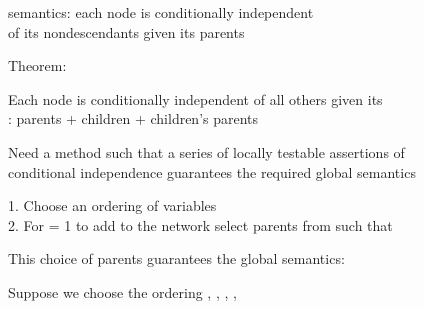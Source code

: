 \documentclass{article}
\begin{document}
\begin{huge}

 semantics: each node is conditionally independent\\
of its nondescendants given its parents

\vspace*{0.2in}

\textwidth
{}

Theorem:  \mat{$\lequiv$} 




Each node is conditionally independent of all others given its\\
: parents + children + children's parents

\vspace*{0.3in}

\textwidth
{}




Need a method such that a series of locally testable assertions of\\
conditional independence guarantees the required global semantics

1. Choose an ordering of variables \\
2. For  = 1 to \al
  add  to the network\al
  select parents from  such that\nl

This choice of parents guarantees the global semantics:


Suppose we choose the ordering , , , , 


\end{huge}
\end{document}
